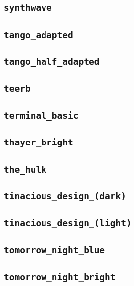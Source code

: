 \subsection{\texttt{synthwave}}
\newpage
\subsection{\texttt{tango\_adapted}}
\newpage
\subsection{\texttt{tango\_half\_adapted}}
\newpage
\subsection{\texttt{teerb}}
\newpage
\subsection{\texttt{terminal\_basic}}
\newpage
\subsection{\texttt{thayer\_bright}}
\newpage
\subsection{\texttt{the\_hulk}}
\newpage
\subsection{\texttt{tinacious\_design\_(dark)}}
\newpage
\subsection{\texttt{tinacious\_design\_(light)}}
\newpage
\subsection{\texttt{tomorrow\_night\_blue}}
\newpage
\subsection{\texttt{tomorrow\_night\_bright}}
\newpage
